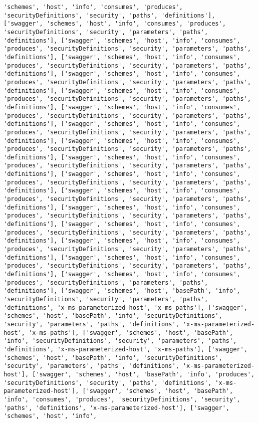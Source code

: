 \documentclass[11pt]{article}
\begin{document}
\begin{Verbatim}[commandchars=\\\{\}]
'schemes', 'host', 'info', 'consumes', 'produces', 'securityDefinitions', 'security', 'paths', 'definitions'], ['swagger', 'schemes', 'host', 'info', 'consumes', 'produces', 'securityDefinitions', 'security', 'parameters', 'paths', 'definitions'], ['swagger', 'schemes', 'host', 'info', 'consumes', 'produces', 'securityDefinitions', 'security', 'parameters', 'paths', 'definitions'], ['swagger', 'schemes', 'host', 'info', 'consumes', 'produces', 'securityDefinitions', 'security', 'parameters', 'paths', 'definitions'], ['swagger', 'schemes', 'host', 'info', 'consumes', 'produces', 'securityDefinitions', 'security', 'parameters', 'paths', 'definitions'], ['swagger', 'schemes', 'host', 'info', 'consumes', 'produces', 'securityDefinitions', 'security', 'parameters', 'paths', 'definitions'], ['swagger', 'schemes', 'host', 'info', 'consumes', 'produces', 'securityDefinitions', 'security', 'parameters', 'paths', 'definitions'], ['swagger', 'schemes', 'host', 'info', 'consumes', 'produces', 'securityDefinitions', 'security', 'parameters', 'paths', 'definitions'], ['swagger', 'schemes', 'host', 'info', 'consumes', 'produces', 'securityDefinitions', 'security', 'parameters', 'paths', 'definitions'], ['swagger', 'schemes', 'host', 'info', 'consumes', 'produces', 'securityDefinitions', 'security', 'parameters', 'paths', 'definitions'], ['swagger', 'schemes', 'host', 'info', 'consumes', 'produces', 'securityDefinitions', 'security', 'parameters', 'paths', 'definitions'], ['swagger', 'schemes', 'host', 'info', 'consumes', 'produces', 'securityDefinitions', 'security', 'parameters', 'paths', 'definitions'], ['swagger', 'schemes', 'host', 'info', 'consumes', 'produces', 'securityDefinitions', 'security', 'parameters', 'paths', 'definitions'], ['swagger', 'schemes', 'host', 'info', 'consumes', 'produces', 'securityDefinitions', 'security', 'parameters', 'paths', 'definitions'], ['swagger', 'schemes', 'host', 'info', 'consumes', 'produces', 'securityDefinitions', 'security', 'parameters', 'paths', 'definitions'], ['swagger', 'schemes', 'host', 'info', 'consumes', 'produces', 'securityDefinitions', 'security', 'parameters', 'paths', 'definitions'], ['swagger', 'schemes', 'host', 'info', 'consumes', 'produces', 'securityDefinitions', 'parameters', 'paths', 'definitions'], ['swagger', 'schemes', 'host', 'basePath', 'info', 'securityDefinitions', 'security', 'parameters', 'paths', 'definitions', 'x-ms-parameterized-host', 'x-ms-paths'], ['swagger', 'schemes', 'host', 'basePath', 'info', 'securityDefinitions', 'security', 'parameters', 'paths', 'definitions', 'x-ms-parameterized-host', 'x-ms-paths'], ['swagger', 'schemes', 'host', 'basePath', 'info', 'securityDefinitions', 'security', 'parameters', 'paths', 'definitions', 'x-ms-parameterized-host', 'x-ms-paths'], ['swagger', 'schemes', 'host', 'basePath', 'info', 'securityDefinitions', 'security', 'parameters', 'paths', 'definitions', 'x-ms-parameterized-host'], ['swagger', 'schemes', 'host', 'basePath', 'info', 'produces', 'securityDefinitions', 'security', 'paths', 'definitions', 'x-ms-parameterized-host'], ['swagger', 'schemes', 'host', 'basePath', 'info', 'consumes', 'produces', 'securityDefinitions', 'security', 'paths', 'definitions', 'x-ms-parameterized-host'], ['swagger', 'schemes', 'host', 'info', 
\end{Verbatim}
\end{document}

